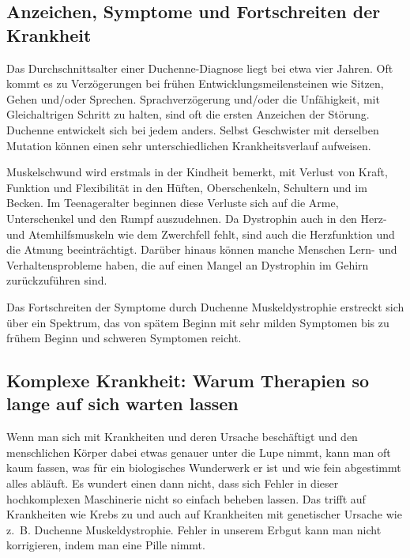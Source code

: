 \documentclass[fontsize=14pt,a4paper,headinclude,DIV=calc,automark]{scrbook}
\begin{document}
\subsection{Anzeichen, Symptome und Fortschreiten der Krankheit}

Das Durchschnittsalter einer Duchenne-Diagnose liegt bei etwa vier Jahren. Oft kommt es zu Verzögerungen bei frühen Entwicklungsmeilensteinen wie Sitzen, Gehen und/oder Sprechen. Sprachverzögerung und/oder die Unfähigkeit, mit Gleichaltrigen Schritt zu halten, sind oft die ersten Anzeichen der Störung. Duchenne entwickelt sich bei jedem anders. Selbst Geschwister mit derselben Mutation können einen sehr unterschiedlichen Krankheitsverlauf aufweisen.

Muskelschwund wird erstmals in der Kindheit bemerkt, mit Verlust von Kraft, Funktion und Flexibilität in den Hüften, Oberschenkeln, Schultern und im Becken. Im Teenageralter beginnen diese Verluste sich auf die Arme, Unterschenkel und den Rumpf auszudehnen. Da Dystrophin auch in den Herz- und Atemhilfsmuskeln wie dem Zwerchfell fehlt, sind auch die Herzfunktion und die Atmung beeinträchtigt. Darüber hinaus können manche Menschen Lern- und Verhaltensprobleme haben, die auf einen Mangel an Dystrophin im Gehirn zurückzuführen sind.

Das Fortschreiten der Symptome durch Duchenne Muskeldystrophie erstreckt sich über ein Spektrum, das von spätem Beginn mit sehr milden Symptomen bis zu frühem Beginn und schweren Symptomen reicht.


\subsection{Komplexe Krankheit: Warum Therapien so lange auf sich warten lassen}

Wenn man sich mit Krankheiten und deren Ursache beschäftigt und den menschlichen Körper dabei etwas genauer unter die Lupe nimmt, kann man oft kaum fassen, was für ein biologisches Wunderwerk er ist und wie fein abgestimmt alles abläuft. Es wundert einen dann nicht, dass sich Fehler in dieser hochkomplexen Maschinerie nicht so einfach beheben lassen. Das trifft auf Krankheiten wie Krebs zu und auch auf Krankheiten mit genetischer Ursache wie z.~B. Duchenne Muskeldystrophie. Fehler in unserem Erbgut kann man nicht korrigieren, indem man eine Pille nimmt.
\end{document}
